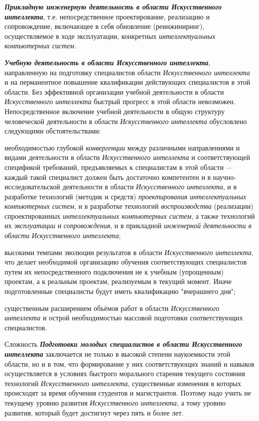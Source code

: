 \begin{textitemize}
	\item
	\textbf{\textit{Прикладную инженерную деятельность в области Искусственного интеллекта}}, т.е. непосредственное проектирование, реализацию и сопровождение, включающее в себя обновление (реинжиниринг), осуществляемое в ходе эксплуатации, конкретных \textit{интеллектуальных компьютерных систем.}
	\item
	\textbf{\textit{Учебную деятельность в области Искусственного интеллекта}}, направленную на подготовку специалистов области \textit{Искусственного интеллекта} и на перманентное повышение квалификации действующих специалистов в этой области. Без эффективной организации учебной деятельности в области \textit{Искусственного интеллекта} быстрый прогресс в этой области невозможен. Непосредственное включение учебной деятельности в общую структуру человеческой деятельности в области \textit{Искусственного интеллекта} обусловлено следующими обстоятельствами:
	\begin{textitemize}
		\item
		необходимостью глубокой \textit{конвергенции} между различными направлениями и видами деятельности в области \textit{Искусственного интеллекта} и соответствующей спецификой требований, предъявляемых к специалистам в этой области --- каждый такой специалист должен быть достаточно компетентен и в научно-исследовательской деятельности в области \textit{Искусственного интеллекта}, и в разработке технологий (методик и средств) \textit{проектирования интеллектуальных компьютерных систем}, и в разработке технологий \textit{воспроизводства} (реализации) спроектированных \textit{интеллектуальных компьютерных систем}, а также технологий их \textit{эксплуатации} и \textit{сопровождения}, и в прикладной \textit{инженерной деятельности в области} \textit{Искусственного интеллекта};
		\item
		высокими темпами эволюции результатов в области \textit{Искусственного интеллекта}, что делает необходимой организацию обучения соответствующих специалистов путем их непосредственного подключения не к учебным (упрощенным) проектам, а к реальным проектам, реализуемым в текущий момент. Иначе подготовленные специалисты будут иметь квалификацию "вчерашнего дня"{};
		\item
		существенным расширением объёмов работ в области \textit{Искусственного интеллекта} и острой необходимостью массовой подготовки соответствующих специалистов.
	\end{textitemize}
	
	Сложность \textbf{\textit{Подготовки молодых специалистов в области Искусственного интеллекта}} заключается не только в высокой степени наукоемкости этой области, но и в том, что формирование у них соответствующих знаний и навыков осуществляется в условиях быстрого морального старения текущего состояния технологий \textit{Искусственного интеллекта}, существенные изменения в которых происходят за время обучения студентов и магистрантов. Поэтому надо учить не текущему уровню развития \textit{Искусственного интеллекта}, а тому уровню развития, который будет достигнут через пять и более лет.
	

\end{textitemize}

